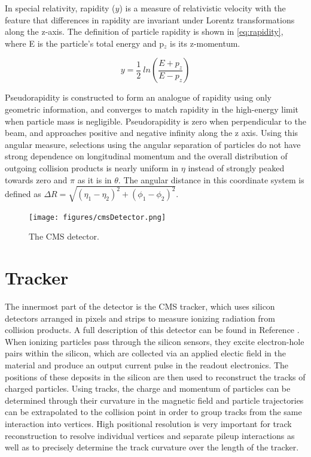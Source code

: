 In special relativity, rapidity ($y$) is a measure of relativistic velocity with the feature that differences in rapidity are invariant under Lorentz transformations along the z-axis.
The definition of particle rapidity is shown in \cref{eq:rapidity}, where E is the particle's total energy and p$_z$ is its z-momentum.

\begin{equation}
    \label{eq:rapidity}
    y = \frac{1}{2} ~ln \left(\frac{E+p_z}{E-p_z}\right)
\end{equation}

Pseudorapidity is constructed to form an analogue of rapidity using only geometric information, and converges to match rapidity in the high-energy limit when particle mass is negligible.
Pseudorapidity is zero when perpendicular to the beam, and approaches positive and negative infinity along the z axis. 
Using this angular measure, selections using the angular separation of particles do not have strong dependence on longitudinal momentum and the overall distribution of outgoing collision products is nearly uniform in $\eta$ instead of strongly peaked towards zero and $\pi$ as it is in $\theta$.  
The angular distance in this coordinate system is defined as $\Delta R = \sqrt{(\eta_1-\eta_2)^2+(\phi_1-\phi_2)^2}$.

\begin{figure}[h]
    \texttt{[image: figures/cmsDetector.png]}
    \centering
    \caption{The CMS detector.}
    \label{fig:detector}
\end{figure}

\section{Tracker}
The innermost part of the detector is the CMS tracker, which uses silicon detectors arranged in pixels and strips to measure ionizing radiation from collision products. 
A full description of this detector can be found in Reference \cite{trackerTDR}.
When ionizing particles pass through the silicon sensors, they excite electron-hole pairs within the silicon, which are collected via an applied electic field in the material and produce an output current pulse in the readout electronics.
The positions of these deposits in the silicon are then used to reconstruct the tracks of charged particles.
Using tracks, the charge and momentum of particles can be determined through their curvature in the magnetic field and particle trajectories can be extrapolated to the collision point in order to group tracks from the same interaction into vertices. 
High positional resolution is very important for track reconstruction to resolve individual vertices and separate pileup interactions as well as to precisely determine the track curvature over the length of the tracker. 

